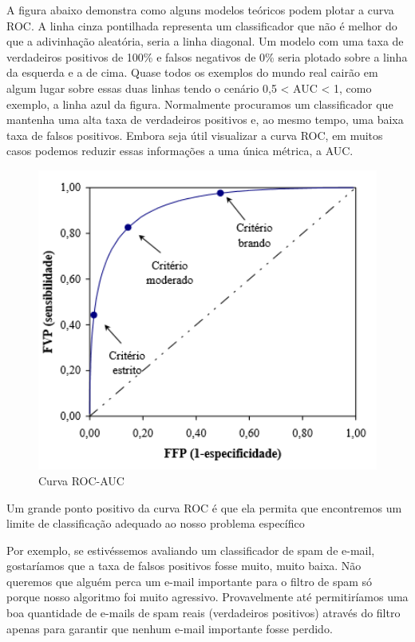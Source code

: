\documentclass[
  letterpaper,
  DIV=11,
  numbers=noendperiod]{scrreprt}
\begin{document}
A figura abaixo demonstra como alguns modelos teóricos podem plotar a
curva ROC. A linha cinza pontilhada representa um classificador que não
é melhor do que a adivinhação aleatória, seria a linha diagonal. Um
modelo com uma taxa de verdadeiros positivos de 100\% e falsos negativos
de 0\% seria plotado sobre a linha da esquerda e a de cima. Quase todos
os exemplos do mundo real cairão em algum lugar sobre essas duas linhas
tendo o cenário 0,5 \textless{} AUC \textless{} 1, como exemplo, a linha
azul da figura. Normalmente procuramos um classificador que mantenha uma
alta taxa de verdadeiros positivos e, ao mesmo tempo, uma baixa taxa de
falsos positivos. Embora seja útil visualizar a curva ROC, em muitos
casos podemos reduzir essas informações a uma única métrica, a AUC.

\hfill\break

\begin{figure}

{\centering \includegraphics[width=1\textwidth,height=\textheight]{./figures/curvaROC.png}

}

\caption{\label{fig:curvaROC}Curva ROC-AUC}

\end{figure}

Um grande ponto positivo da curva ROC é que ela permita que encontremos
um limite de classificação adequado ao nosso problema específico

Por exemplo, se estivéssemos avaliando um classificador de spam de
e-mail, gostaríamos que a taxa de falsos positivos fosse muito, muito
baixa. Não queremos que alguém perca um e-mail importante para o filtro
de spam só porque nosso algoritmo foi muito agressivo. Provavelmente até
permitiríamos uma boa quantidade de e-mails de spam reais (verdadeiros
positivos) através do filtro apenas para garantir que nenhum e-mail
importante fosse perdido.
\end{document}
